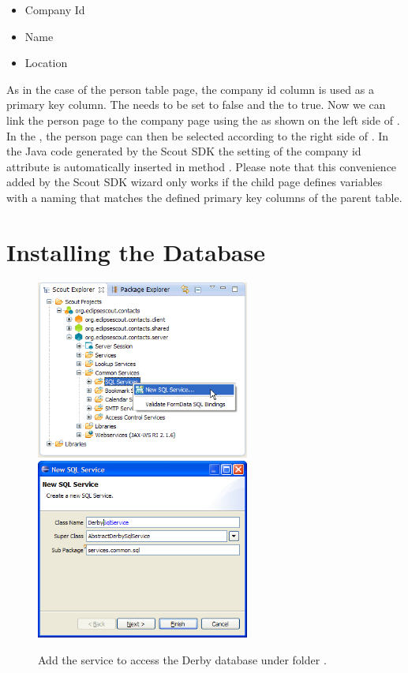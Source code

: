 \documentclass[a4paper,10pt,twoside]{book}
\begin{document}
\begin{itemize}
  \item{Company Id}
  \item{Name}
  \item{Location}
\end{itemize}

As in the case of the person table page, the company id column is used as a primary key column. 
The  needs to be set to false and the  to true. 
Now we can link the person page to the company page using the  as shown on the left side of . 
In the , the person page can then be selected according to the right side of . 
In the Java code generated by the Scout SDK the setting of the company id attribute is automatically inserted in method . 
Please note that this convenience added by the Scout SDK wizard only works if the child page defines variables with a naming that matches the defined primary key columns of the parent table. 

\section{Installing the Database}

\begin{figure}
\includegraphics[width=7cm]{new_service_derby_contextmenu.png} \hspace{5mm}
\includegraphics[width=7cm]{new_service_derby.png} 
\caption{Add the service to access the Derby database under folder . }
\end{figure}
\end{document}
